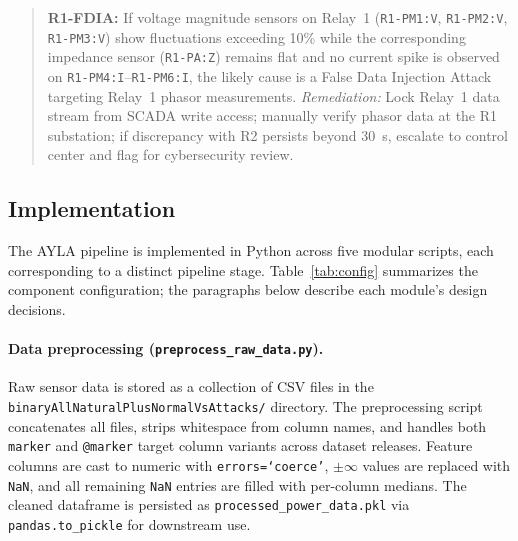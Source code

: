 \documentclass[twocolumn, 10pt, letterpaper]{article}
\begin{document}
\begin{quote}\small
\textbf{R1-FDIA:} If voltage magnitude sensors on Relay~1 (\texttt{R1-PM1:V},
\texttt{R1-PM2:V}, \texttt{R1-PM3:V}) show fluctuations exceeding 10\% while the
corresponding impedance sensor (\texttt{R1-PA:Z}) remains flat and no current spike
is observed on \texttt{R1-PM4:I}--\texttt{R1-PM6:I}, the likely cause is a False
Data Injection Attack targeting Relay~1 phasor measurements.
\textit{Remediation:} Lock Relay~1 data stream from SCADA write access; manually
verify phasor data at the R1 substation; if discrepancy with R2 persists beyond
30~s, escalate to control center and flag for cybersecurity review.
\end{quote}

\subsection{Implementation}

The AYLA pipeline is implemented in Python across five modular scripts,
each corresponding to a distinct pipeline stage.
Table~\ref{tab:config} summarizes the component configuration;
the paragraphs below describe each module's design decisions.

\paragraph{Data preprocessing (\texttt{preprocess\_raw\_data.py}).}
Raw sensor data is stored as a collection of CSV files in the
\texttt{binaryAllNaturalPlusNormalVsAttacks/} directory.
The preprocessing script concatenates all files, strips whitespace from column
names, and handles both \texttt{marker} and \texttt{@marker} target column
variants across dataset releases.
Feature columns are cast to numeric with \texttt{errors=`coerce'},
$\pm\infty$ values are replaced with \texttt{NaN}, and all remaining
\texttt{NaN} entries are filled with per-column medians.
The cleaned dataframe is persisted as \texttt{processed\_power\_data.pkl}
via \texttt{pandas.to\_pickle} for downstream use.
\end{document}
